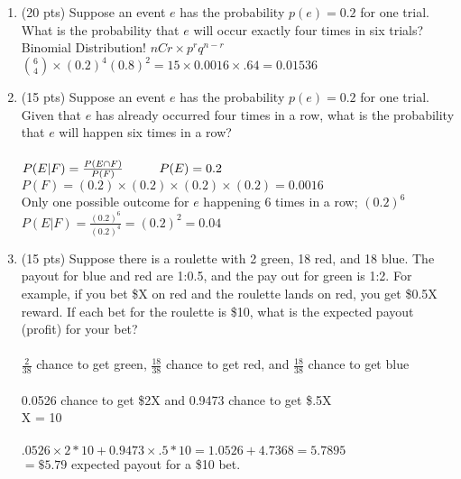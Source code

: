 \documentclass[11pt]{article}
\newcommand\tab[1][1cm]{\hspace*{#1}}
\begin{document}
\begin{enumerate}
\begin{enumerate}
    \end{enumerate}

    \item (20 pts) Suppose an event $e$ has the probability $p(e) = 0.2$ for one trial. What is the probability that $e$ will occur exactly four times in six trials? \\
    \tab Binomial Distribution!  $nCr\times p^rq^{n-r}$ \\
    \tab $\binom{6}{4}\times(0.2)^4(0.8)^2 = 15\times0.0016\times.64 = \mathbf{0.01536}$

   
    \item (15 pts) Suppose an event $e$ has the probability $p(e) = 0.2$ for one trial. Given that $e$ has already occurred four times in a row, what is the probability that $e$ will happen six times in a row? \\\\
    \tab $P(E | F) = \frac{P(E \cap F)}{P(F)} \tab P(E) = 0.2$ \\
    \tab $P(F) = (0.2) \times (0.2) \times (0.2) \times (0.2) = 0.0016$ \\
    \tab Only one possible outcome for $e$ happening 6 times in a row; $(0.2)^6$ \\
    \tab $P(E | F) = \frac{(0.2)^6}{(0.2)^4} = (0.2)^2 = 0.04$ \\
    
    \item (15 pts) Suppose there is a roulette with 2 green, 18 red, and 18 blue. The payout for blue and red are 1:0.5, and the pay out for green is 1:2. For example, if you bet \$X on red and the roulette lands on red, you get \$0.5X reward. If each bet for the roulette is \$10, what is the expected payout (profit) for your bet? \\\\
    \tab $\frac{2}{38}$ chance to get green, $\frac{18}{38}$ chance to get red, and $\frac{18}{38}$ chance to get blue \\\\
    \tab 0.0526 chance to get \$2X and 0.9473 chance to get \$.5X \\
    \tab X = 10 \\\\
    \tab $.0526\times 2*10 + 0.9473\times .5*10 = 1.0526+4.7368 = 5.7895$ \\
    \tab $=\mathbf{ \$5.79}$ expected payout for a \$10 bet. 

 \end{enumerate}
\end{document}
